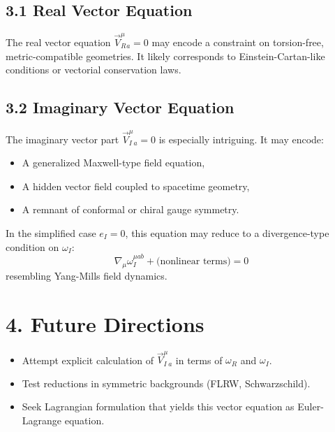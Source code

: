 \documentclass[12pt]{article}
\begin{document}
\subsection*{3.1 Real Vector Equation}

The real vector equation $\vec{V}_R^\mu_a = 0$ may encode a constraint on torsion-free, metric-compatible geometries. It likely corresponds to Einstein-Cartan-like conditions or vectorial conservation laws.

\subsection*{3.2 Imaginary Vector Equation}

The imaginary vector part $\vec{V}_I^\mu_a = 0$ is especially intriguing. It may encode:
\begin{itemize}
  \item A generalized Maxwell-type field equation,
  \item A hidden vector field coupled to spacetime geometry,
  \item A remnant of conformal or chiral gauge symmetry.
\end{itemize}

In the simplified case $e_I = 0$, this equation may reduce to a divergence-type condition on $\omega_I$:
\[
\nabla_\mu \omega_I^{\mu ab} + \text{(nonlinear terms)} = 0
\]
resembling Yang-Mills field dynamics.

\section*{4. Future Directions}

\begin{itemize}
  \item Attempt explicit calculation of $\vec{V}_I^\mu_a$ in terms of $\omega_R$ and $\omega_I$.
  \item Test reductions in symmetric backgrounds (FLRW, Schwarzschild).
  \item Seek Lagrangian formulation that yields this vector equation as Euler-Lagrange equation.
\end{itemize}
\end{document}
